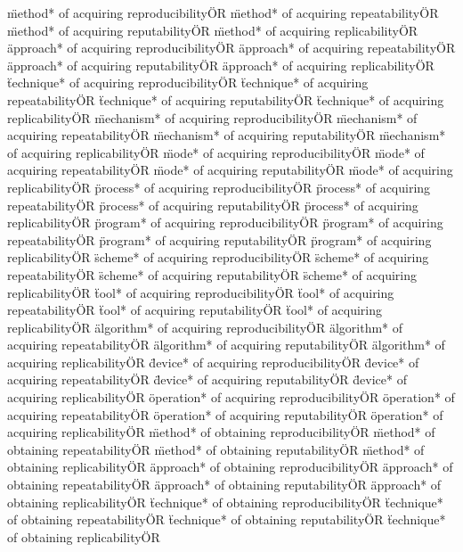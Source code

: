\documentclass[
10pt, %
a4paper, %
oneside, %
headinclude,footinclude, %
BCOR5mm, %
]{scrartcl}
\begin{document}
\"method* of acquiring reproducibility\" OR \"method* of acquiring repeatability\" OR \"method* of acquiring reputability\" OR \"method* of acquiring replicability\" OR 
\"approach* of acquiring reproducibility\" OR \"approach* of acquiring repeatability\" OR \"approach* of acquiring reputability\" OR \"approach* of acquiring replicability\" OR 
\"technique* of acquiring reproducibility\" OR \"technique* of acquiring repeatability\" OR \"technique* of acquiring reputability\" OR \"technique* of acquiring replicability\" OR 
\"mechanism* of acquiring reproducibility\" OR \"mechanism* of acquiring repeatability\" OR \"mechanism* of acquiring reputability\" OR \"mechanism* of acquiring replicability\" OR 
\"mode* of acquiring reproducibility\" OR \"mode* of acquiring repeatability\" OR \"mode* of acquiring reputability\" OR \"mode* of acquiring replicability\" OR 
\"process* of acquiring reproducibility\" OR \"process* of acquiring repeatability\" OR \"process* of acquiring reputability\" OR \"process* of acquiring replicability\" OR 
\"program* of acquiring reproducibility\" OR \"program* of acquiring repeatability\" OR \"program* of acquiring reputability\" OR \"program* of acquiring replicability\" OR 
\"scheme* of acquiring reproducibility\" OR \"scheme* of acquiring repeatability\" OR \"scheme* of acquiring reputability\" OR \"scheme* of acquiring replicability\" OR 
\"tool* of acquiring reproducibility\" OR \"tool* of acquiring repeatability\" OR \"tool* of acquiring reputability\" OR \"tool* of acquiring replicability\" OR 
\"algorithm* of acquiring reproducibility\" OR \"algorithm* of acquiring repeatability\" OR \"algorithm* of acquiring reputability\" OR \"algorithm* of acquiring replicability\" OR 
\"device* of acquiring reproducibility\" OR \"device* of acquiring repeatability\" OR \"device* of acquiring reputability\" OR \"device* of acquiring replicability\" OR 
\"operation* of acquiring reproducibility\" OR \"operation* of acquiring repeatability\" OR \"operation* of acquiring reputability\" OR \"operation* of acquiring replicability\" OR 
\"method* of obtaining reproducibility\" OR \"method* of obtaining repeatability\" OR \"method* of obtaining reputability\" OR \"method* of obtaining replicability\" OR 
\"approach* of obtaining reproducibility\" OR \"approach* of obtaining repeatability\" OR \"approach* of obtaining reputability\" OR \"approach* of obtaining replicability\" OR 
\"technique* of obtaining reproducibility\" OR \"technique* of obtaining repeatability\" OR \"technique* of obtaining reputability\" OR \"technique* of obtaining replicability\" OR 
\end{document}
